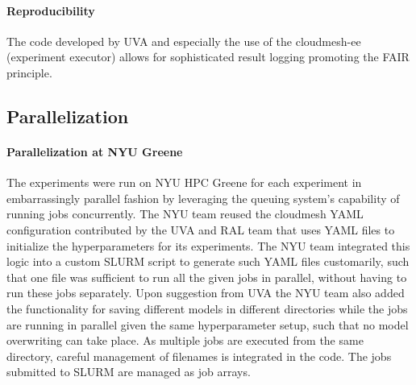 \documentclass[sigplan,screen]{acmart}
\begin{document}
\paragraph{Reproducibility} The code developed by UVA and especially the use of the cloudmesh-ee (experiment executor) \cite{github-cloudmesh-ee,las-2023-escience-cloudmask} allows for sophisticated result logging promoting the FAIR principle.

\subsection{Parallelization}
\label{sec:parallel}

\paragraph{Parallelization at NYU Greene} The experiments were run on NYU HPC Greene for each experiment in embarrassingly parallel fashion by leveraging the queuing system's capability of running jobs concurrently.
The NYU team reused the cloudmesh YAML configuration contributed by the UVA and RAL team 
that uses YAML files to initialize the hyperparameters for its experiments.
The NYU team integrated this logic into a custom SLURM script to generate such YAML files 
customarily, such that one file was sufficient to run all the given jobs in parallel, without having to run these jobs separately. Upon suggestion from UVA the NYU team also added the functionality for saving different models in different directories while the jobs are running in parallel given the same hyperparameter setup, such that no model overwriting can take place. As multiple jobs are executed from the same directory, careful management of filenames is integrated in the code. The jobs submitted to SLURM are managed as job arrays.
\end{document}
